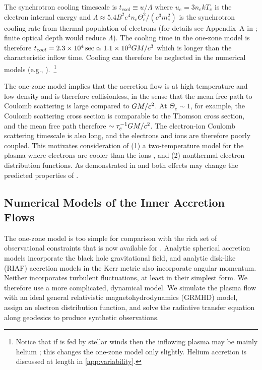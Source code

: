 The synchrotron cooling timescale is $t_{cool} \equiv u/\Lambda$ where $u_e = 3 n_e k T_e$ is the electron internal energy and $\Lambda \approx 5.4 B^2 e^4 n_e \Theta_e^2 /(c^3 m_e^2)$ is the synchrotron cooling rate from thermal population of electrons (for details see Appendix~A in \citealt{2011ApJ...735....9M}; finite optical depth would reduce $\Lambda$). The cooling time in the one-zone model is therefore $t_{cool}=2.3 \times 10^4\sec \simeq 1.1 \times 10^3 GM/c^3$ which is longer than the characteristic inflow time. Cooling can therefore be neglected in the numerical models (e.g., \citealt{2012MNRAS.426.1928D}).~\footnote{Notice that if \sgra is fed by stellar winds then the inflowing plasma may be mainly helium \citep{2019MNRAS.482L.123R}; this changes the one-zone model only slightly.  Helium accretion is discussed at length in \ref{app:variability}.}

The one-zone model implies that the accretion flow is at high temperature and low density and is therefore collisionless, in the sense that the mean free path to Coulomb scattering is large compared to $GM/c^2$. At $\Theta_e \sim 1$, for example, the Coulomb scattering cross section is comparable to the Thomson cross section, and the mean free path therefore $\sim \tau_e^{-1} GM/c^2$.  The electron-ion Coulomb scattering timescale is also long, and the electrons and ions are therefore poorly coupled.  This motivates consideration of (1) a two-temperature model for the plasma where electrons are cooler than the ions \citep{1976ApJ...204..187S,1977ApJ...214..840I, 1982Natur.295...17R}, and (2) nonthermal electron distribution functions.  As demonstrated in \citet{2014A&A...570A...7M} and \citet{2000ApJ...541..234O} both effects may change the predicted properties of \sgra.


\subsection{Numerical Models of the Inner Accretion Flows}

The one-zone model is too simple for comparison with the rich set of observational constraints that is now available for \sgra.  Analytic spherical accretion models \citep[e.g.]{2019ApJ...885L..33N, arXiv:2111.02178} incorporate the black hole gravitational field, and analytic disk-like (RIAF) accretion models in the Kerr metric \citep[e.g.]{2009ApJ...697...45B,2009ApJ...706..960H} also incorporate angular momentum.   Neither incorporates turbulent fluctuations, at least in their simplest form.  We therefore use a more complicated, dynamical model.  We simulate the plasma flow with an ideal general relativistic magnetohydrodynamics (GRMHD) model, assign an electron distribution function, and solve the radiative transfer equation along geodesics to produce synthetic observations.

